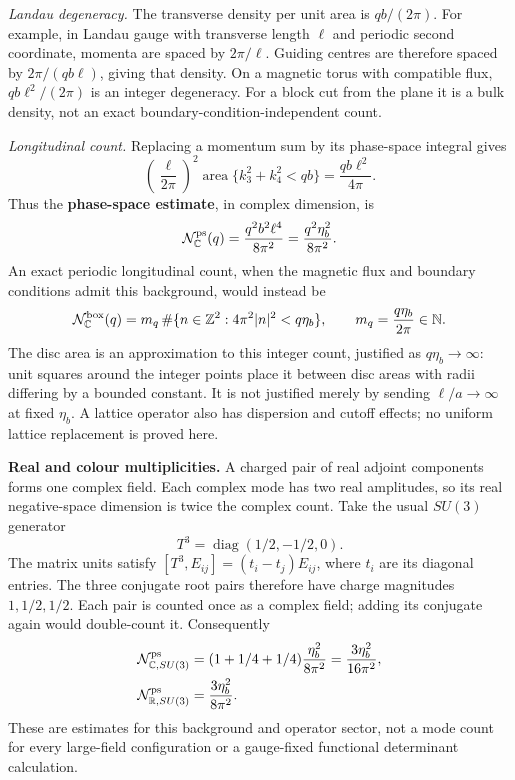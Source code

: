 \documentclass[11pt,a4paper]{article}
\begin{document}
\emph{Landau degeneracy.} The transverse density per unit area is
\(qb/(2\pi)\). For example, in Landau gauge with transverse length
\(\ell\) and periodic second coordinate, momenta are spaced by
\(2\pi/\ell\). Guiding centres are therefore spaced by
\(2\pi/(qb\ell)\), giving that density. On a magnetic torus with
compatible flux, \(qb\ell^2/(2\pi)\) is an integer degeneracy. For a
block cut from the plane it is a bulk density, not an exact
boundary-condition-independent count.

\emph{Longitudinal count.} Replacing a momentum sum by its phase-space
integral gives \[\left(\frac\ell{2\pi}\right)^2
\operatorname{area}\{k_3^2+k_4^2<qb\}
=\frac{qb\ell^2}{4\pi}.\] Thus the \textbf{phase-space estimate}, in
complex dimension, is \[\mathcal N_{\mathbb C}^{\rm ps}(q)
=\frac{q^2b^2\ell^4}{8\pi^2}
=\frac{q^2\eta_b^2}{8\pi^2}.\] An exact periodic longitudinal count,
when the magnetic flux and boundary conditions admit this background,
would instead be \[\mathcal N_{\mathbb C}^{\rm box}(q)
=m_q\,\#\{n\in\mathbb Z^2:4\pi^2|n|^2<q\eta_b\},
\qquad m_q=\frac{q\eta_b}{2\pi}\in\mathbb N.\] The disc area is an
approximation to this integer count, justified as \(q\eta_b\to\infty\):
unit squares around the integer points place it between disc areas with
radii differing by a bounded constant. It is not justified merely by
sending \(\ell/a\to\infty\) at fixed \(\eta_b\). A lattice operator also
has dispersion and cutoff effects; no uniform lattice replacement is
proved here.

\textbf{Real and colour multiplicities.} A charged pair of real adjoint
components forms one complex field. Each complex mode has two real
amplitudes, so its real negative-space dimension is twice the complex
count. Take the usual \(SU(3)\) generator
\[T^3=\operatorname{diag}(1/2,-1/2,0).\] The matrix units satisfy
\([T^3,E_{ij}]=(t_i-t_j)E_{ij}\), where \(t_i\) are its diagonal
entries. The three conjugate root pairs therefore have charge magnitudes
\(1,1/2,1/2\). Each pair is counted once as a complex field; adding its
conjugate again would double-count it. Consequently \[\begin{aligned}
\mathcal N_{\mathbb C,SU(3)}^{\rm ps}
&=(1+1/4+1/4)\frac{\eta_b^2}{8\pi^2}
=\frac{3\eta_b^2}{16\pi^2},\\
\mathcal N_{\mathbb R,SU(3)}^{\rm ps}
&=\frac{3\eta_b^2}{8\pi^2}.
\end{aligned}\] These are estimates for this background and operator
sector, not a mode count for every large-field configuration or a
gauge-fixed functional determinant calculation.
\end{document}
